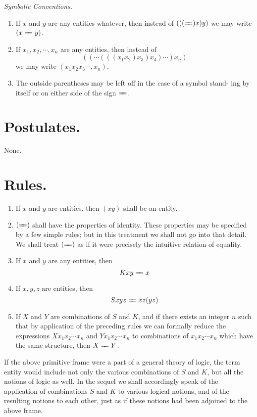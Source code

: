 \documentclass[10pt, twoside]{extarticle}
\def\varequals#1{\mathrel{\leaders\hbox to3pt{$=$\hss}\hskip#1=}}
\newcommand\longeq{\varequals{0.4em}}
\theoremstyle{breaktheorem}
\theoremstyle{mylemma}
\theoremstyle{mydefinition}
\theoremstyle{mycorollary}
\begin{document}
\vspace{0.5em}
\noindent \textit{Symbolic Conventions.}
\begin{enumerate}[label=\arabic*.]
\item If \(x\) and \(y\) are any entities whatever, then instead of \((((\longeq)x)y)\)
we may write \((x\longeq y)\).
\item If \(x_1, x_2, \cdots, x_n\) are any entities, then instead of
\[((\cdots (((x_1 x_2)x_3)x_4)\cdots)x_n) \]
we may write \((x_1 x_2 x_3 \cdots, x_n)\).
\item The outside parentheses may be left off in the case of a symbol stand-
ing by itself or on either side of the sign \(\longeq\).
\end{enumerate}

\section{Postulates.}
None.
\section{Rules.}

\begin{enumerate}[label=\arabic*., start=0]
\item If \(x\) and \(y\) are entities, then \((xy)\) shall be an entity.
\item \((\longeq)\) shall have the properties of identity. These properties may be
specified by a few simple rules; but in this treatment we shall not go into
that detail. We shall treat \((\longeq)\) as if it were precisely the intuitive relation
of equality.
\item If \(x\) and \(y\) are any entities, then
  \[Kxy \longeq x\]
\item If \(x,y,z\) are entities, then
  \[Sxyz \longeq xz(yz)\]
\item If \(X\) and \(Y\) are combinations of \(S\) and \(K\), and if there exists an
  integer \(n\) such that by application of the preceding rules we can formally
  reduce the expressions \(Xx_1 x_2 \cdots x_n\) and \(Yx_1 x_2 \cdots x_n\) to combinations of
  \(x_1 x_2 \cdots x_n\) which have the same structure, then \(X \longeq Y\).
\end{enumerate}

If the above primitive frame were a part of a general theory of logic, the
term entity would include not only the various combinations of \(S\) and \(K\), but
all the notions of logic as well. In the sequel we shall accordingly speak of
the application of combinations \(S\) and \(K\) to various logical notions, and of the
resulting notions to each other, just as if these notions had been adjoined to
the above frame.
\end{document}
